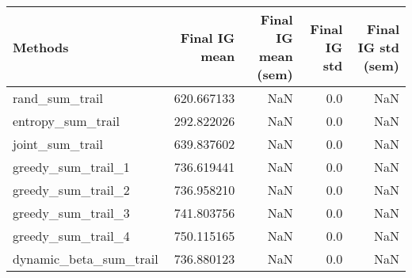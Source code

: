 \begin{tabular}{lrrrr}
\toprule
                Methods &  Final IG mean &  Final IG mean (sem) &  Final IG std &  Final IG std (sem) \\
\midrule
         rand\_sum\_trail &     620.667133 &                  NaN &           0.0 &                 NaN \\
      entropy\_sum\_trail &     292.822026 &                  NaN &           0.0 &                 NaN \\
        joint\_sum\_trail &     639.837602 &                  NaN &           0.0 &                 NaN \\
     greedy\_sum\_trail\_1 &     736.619441 &                  NaN &           0.0 &                 NaN \\
     greedy\_sum\_trail\_2 &     736.958210 &                  NaN &           0.0 &                 NaN \\
     greedy\_sum\_trail\_3 &     741.803756 &                  NaN &           0.0 &                 NaN \\
     greedy\_sum\_trail\_4 &     750.115165 &                  NaN &           0.0 &                 NaN \\
 dynamic\_beta\_sum\_trail &     736.880123 &                  NaN &           0.0 &                 NaN \\
\bottomrule
\end{tabular}
